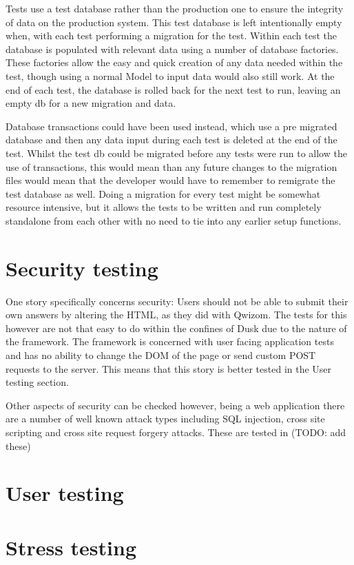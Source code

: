Tests use a test database rather than the production one to ensure the integrity of data on the production system. This test database is left intentionally empty when, with each test performing a migration for the test. Within each test the database is populated with relevant data using a number of database factories. These factories allow the easy and quick creation of any data needed within the test, though using a normal Model to input data would also still work. At the end of each test, the database is rolled back for the next test to run, leaving an empty db for a new migration and data.

Database transactions could have been used instead, which use a pre migrated database and then any data input during each test is deleted at the end of the test. Whilst the test db could be migrated before any tests were run to allow the use of transactions, this would mean than any future changes to the migration files would mean that the developer would have to remember to remigrate the test database as well. Doing a migration for every test might be somewhat resource intensive, but it allows the tests to be written and run completely standalone from each other with no need to tie into any earlier setup functions. 

\section{Security testing}
One story specifically concerns security: Users should not be able to submit their own answers by altering the HTML, as they did with Qwizom. The tests for this however are not that easy to do within the confines of Dusk due to the nature of the framework. The framework is concerned with user facing application tests and has no ability to change the DOM of the page or send custom POST requests to the server. This means that this story is better tested in the User testing section.

Other aspects of security can be checked however, being a web application there are a number of well known attack types including SQL injection, cross site scripting and cross site request forgery attacks. These are tested in (TODO: add these)

\section{User testing}


\section{Stress testing}


